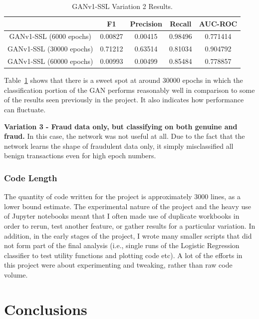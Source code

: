 \documentclass[12pt,a4paper,twoside]{report}
\begin{document}
\begin{table}[H]  
  \centering
  \begin{tabular}{ccccc}
    \toprule
           		& F1 & Precision & Recall & AUC-ROC \\ \midrule
    GANv1-SSL (6000 epochs) & 0.00827  &  0.00415 & 0.98496  & 0.771414 \\
    GANv1-SSL (30000 epochs) & 0.71212  &  0.63514 & 0.81034  & 0.904792 \\
    GANv1-SSL (60000 epochs) & 0.00993   &   0.00499 & 0.85484 & 0.778857  \\
   
   \bottomrule
 \end{tabular}
 \caption{GANv1-SSL Variation 2 Results.}
\label{table:ganv1-ssl-halfhalf}
\end{table}

Table~\ref{table:ganv1-ssl-halfhalf} shows that there is a sweet spot at around 30000 epochs in which the classification portion of the GAN performs reasonably well in comparison to some of the results seen previously in the project. It also indicates how performance can fluctuate. 

\textbf{Variation 3 - Fraud data only, but classifying on both genuine and fraud.}
In this case, the network was not useful at all. Due to the fact that the network learns the shape of fraudulent data only, it simply misclassified all benign transactions even for high epoch numbers. 

\subsection{Code Length}
The quantity of code written for the project is approximately 3000 lines, as a lower bound estimate. The experimental nature of the project and the heavy use of Jupyter notebooks meant that I often made use of duplicate workbooks in order to rerun, test another feature, or gather results for a particular variation. In addition, in the early stages of the project, I wrote many smaller scripts that did not form part of the final analysis (i.e., single runs of the Logistic Regression classifier to test utility functions and plotting code etc). 
A lot of the efforts in this project were about experimenting and tweaking, rather than raw code volume.


\chapter{Conclusions}
\end{document}
